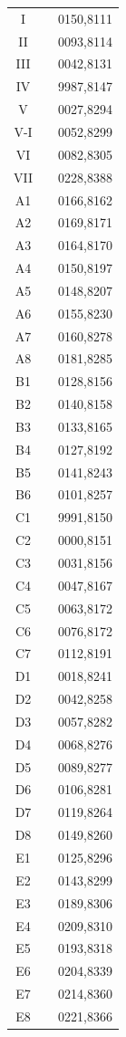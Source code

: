 \documentclass{article}
\begin{document}
\begin{multicols}{2}
\begin{tabular}{|c|c|c|}
	\hline
	I & & 0150,8111\\
	II & & 0093,8114\\
	III & & 0042,8131\\
	IV & & 9987,8147\\
	V & & 0027,8294\\
	V-I & & 0052,8299\\
	VI & & 0082,8305\\
	VII & & 0228,8388\\
	\hline
	A1 & & 0166,8162\\
	A2 & & 0169,8171\\
	A3 & & 0164,8170\\
	A4 & & 0150,8197\\
	A5 & & 0148,8207\\
	A6 & & 0155,8230\\
	A7 & & 0160,8278\\
	A8 & & 0181,8285\\
	\hline
	B1 & & 0128,8156\\
	B2 & & 0140,8158\\
	B3 & & 0133,8165\\
	B4 & & 0127,8192\\
	B5 & & 0141,8243\\
	B6 & & 0101,8257\\
	\hline
	C1 & & 9991,8150\\
	C2 & & 0000,8151\\
	C3 & & 0031,8156\\
	C4 & & 0047,8167\\
	C5 & & 0063,8172\\
	C6 & & 0076,8172\\
	C7 & & 0112,8191\\
	\hline
	D1 & & 0018,8241\\
	D2 & & 0042,8258\\
	D3 & & 0057,8282\\
	D4 & & 0068,8276\\
	D5 & & 0089,8277\\
	D6 & & 0106,8281\\
	D7 & & 0119,8264\\
	D8 & & 0149,8260\\
	\hline
	E1 & & 0125,8296\\
	E2 & & 0143,8299\\
	E3 & & 0189,8306\\
	E4 & & 0209,8310\\
	E5 & & 0193,8318\\
	E6 & & 0204,8339\\
	E7 & & 0214,8360\\
	E8 & & 0221,8366\\
	\hline
\end{tabular}
\end{multicols}
\end{document}
